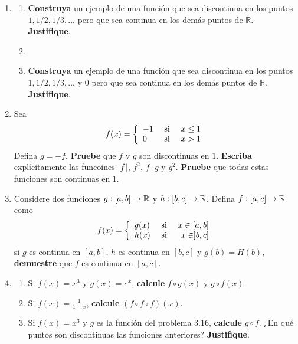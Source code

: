 \documentclass[12pt]{article}
\begin{document}
\begin{enumerate}
    \item \begin{enumerate}
        \item \textbf{Construya} un ejemplo de una función que sea discontinua en los puntos $1,1/2,1/3,...$ pero que sea continua en los demás puntos de $\mathbb{R}$. \textbf{Justifique}.
        \item \item \textbf{Construya} un ejemplo de una función que sea discontinua en los puntos $1,1/2,1/3,...$ y $0$ pero que sea continua en los demás puntos de $\mathbb{R}$. \textbf{Justifique}.
    \end{enumerate}

    \item Sea
    \begin{equation*}
        f(x)=\left\{
            \begin{array}{lcr}
                -1 & \textup{ si } & x\leq 1 \\
                0 & \textup{ si } & x>1 \\
            \end{array}
        \right.
    \end{equation*}
    Defina $g=-f$. \textbf{Pruebe} que $f$ y $g$ son discontinuas en $1$. \textbf{Escriba} explícitamente las funcoines $\left| f \right|$, $f^2$, $f\cdot g$ y $g^2$. \textbf{Pruebe} que todas estas funciones son continuas en $1$.

    \item Considere dos funciones $g:[a,b]\rightarrow\mathbb{R}$ y $h:[b,c]\rightarrow\mathbb{R}$. Defina $f:[a,c]\rightarrow\mathbb{R}$ como
    \begin{equation*}
        f(x)=\left\{
            \begin{array}{lcr}
                g(x) & \textup{ si } & x\in[a,b] \\
                h(x) & \textup{ si } & x\in]b,c] \\
            \end{array}
        \right.
    \end{equation*}
    si $g$ es continua en $[a,b]$, $h$ es continua en $[b,c]$ y $g(b)=H(b)$, \textbf{demuestre} que $f$ es continua en $[a,c]$.

    \item \begin{enumerate}
        \item Si $f(x)=x^3$ y $g(x)=e^x$, \textbf{calcule} $f\circ g(x)$ y $g\circ f(x)$.
        \item Si $f(x)=\frac{1}{1-x}$, \textbf{calcule} $(f\circ f\circ f)(x)$.
        \item Si $f(x)=x^3$ y $g$ es la función del problema 3.16, \textbf{calcule} $g\circ f$.
        ¿En qué puntos son discontinuas las funciones anteriores? \textbf{Justifique}.
    \end{enumerate}


\end{enumerate}
\end{document}
